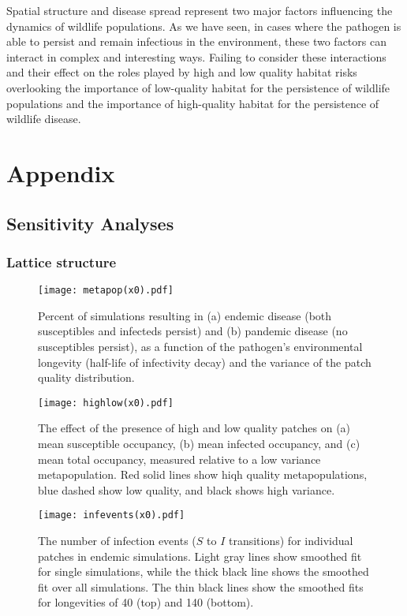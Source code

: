 \documentclass{svjour3}
\begin{document}
Spatial structure and disease spread represent two major factors influencing the dynamics of wildlife populations.  As we have seen, in cases where the pathogen is able to persist and remain infectious in the environment, these two factors can interact in complex and interesting ways.  Failing to consider these interactions and their effect on the roles played by high and low quality habitat risks overlooking the importance of low-quality habitat for the persistence of wildlife populations and the importance of high-quality habitat for the persistence of wildlife disease.

\clearpage

\section{Appendix}

\subsection{Sensitivity Analyses}

\subsubsection{Lattice structure}

\begin{figure}[h!]
\centering
\texttt{[image: metapop(x0).pdf]}
\caption{Percent of simulations resulting in (a) endemic disease (both susceptibles and infecteds persist) and (b) pandemic disease (no susceptibles persist), as a function of the pathogen's environmental longevity (half-life of infectivity decay) and the variance of the patch quality distribution.}
\label{poutcome_x0}
\end{figure}   

\begin{figure}
\centering
\texttt{[image: highlow(x0).pdf]}
\caption{The effect of the presence of high and low quality patches on (a) mean susceptible occupancy, (b) mean infected occupancy, and (c) mean total occupancy, measured relative to  a low variance metapopulation.  Red solid lines show hiqh quality metapopulations, blue dashed show low quality, and black shows high variance.}
\label{sens_x0}
\end{figure}

\begin{figure}
\centering
\texttt{[image: infevents(x0).pdf]}
\caption{The number of infection events ($S$ to $I$ transitions) for individual patches in endemic simulations.  Light gray lines show smoothed fit for single simulations, while the thick black line shows the smoothed fit over all simulations.  The thin black lines show the smoothed fits for longevities of 40 (top) and 140 (bottom).}
\label{infections_x0}
\end{figure}
\end{document}
